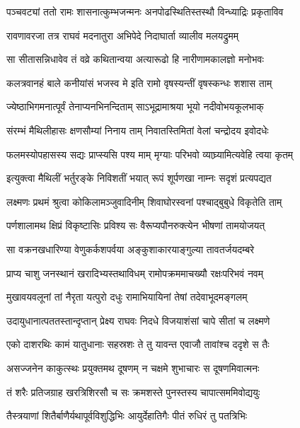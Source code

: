 \twolineshloka
{पञ्चवट्यां ततो रामः शासनात्कुम्भजन्मनः}
{अनपोढस्थितिस्तस्थौ विन्ध्याद्रिः प्रकृताविव} %

\twolineshloka
{रावणावरजा तत्र राघवं मदनातुरा}
{अभिपेदे निदाघार्ता व्यालीव मलयद्रुमम्} %

\twolineshloka
{सा सीतासन्निधावेव तं वव्रे कथितान्वया}
{अत्यारूढो हि नारीणामकालज्ञो मनोभवः} %

\twolineshloka
{कलत्रवानहं बाले कनीयांसं भजस्व मे}
{इति रामो वृषस्यन्तीं वृषस्कन्धः शशास ताम्} %

\twolineshloka
{ज्येष्ठाभिगमनात्पूर्वं तेनाप्यनभिनन्दिताम्}
{साऽभूद्रामाश्रया भूयो नदीवोभयकूलभाक्} %

\twolineshloka
{संरम्भं मैथिलीहासः क्षणसौम्यां निनाय ताम्}
{निवातस्तिमितां वेलां चन्द्रोदय इवोदधेः} %

\twolineshloka
{फलमस्योपहासस्य सद्यः प्राप्स्यसि पश्य माम्}
{मृग्याः परिभवो व्याघ्र्यामित्यवेहि त्वया कृतम्} %

\twolineshloka
{इत्युक्त्वा मैथिलीं भर्तुरङ्के निविशतीं भयात्}
{रूपं शूर्पणखा नाम्नः सदृशं प्रत्यपद्यत} %

\twolineshloka
{लक्ष्मणः प्रथमं श्रुत्वा कोकिलामञ्जुवादिनीम्}
{शिवाघोरस्वनां पश्चाद्बुबुधे विकृतेति ताम्} %

\twolineshloka
{पर्णशालामथ क्षिप्रं विकृष्टासिः प्रविश्य सः}
{वैरूप्यपौनरुक्त्येन भीषणां तामयोजयत्} %

\twolineshloka
{सा वक्रनखधारिण्या वेणुकर्कशपर्वया}
{अङ्कुशाकारयाङ्गुल्या तावतर्जयदम्बरे} %

\twolineshloka
{प्राप्य चाशु जनस्थानं खरादिभ्यस्तथाविधम्}
{रामोपक्रममाचख्यौ रक्षःपरिभवं नवम्} %

\twolineshloka
{मुखावयवलूनां तां नैरृता यत्पुरो दधुः}
{रामाभियायिनां तेषां तदेवाभूदमङ्गलम्} %

\twolineshloka
{उदायुधानात्पततस्तान्दृप्तान् प्रेक्ष्य राघवः}
{निदधे विजयाशंसां चापे सीतां च लक्ष्मणे} %

\twolineshloka
{एको दाशरथिः कामं यातुधानाः सहस्रशः}
{ते तु यावन्त एवाजौ तावांश्च ददृशे स तैः} %

\twolineshloka
{असज्जनेन काकुत्स्थः प्रयुक्तमथ दूषणम्}
{न चक्षमे शुभाचारः स दूषणमिवात्मनः} %

\twolineshloka
{तं शरैः प्रतिजग्राह खरत्रिशिरसौ च सः}
{क्रमशस्ते पुनस्तस्य चापात्सममिवोद्ययुः} %

\twolineshloka
{तैस्त्रयाणां शितैर्बाणैर्यथापूर्वविशुद्धिभिः}
{आयुर्देहातिगैः पीतं रुधिरं तु पतत्रिभिः} %

